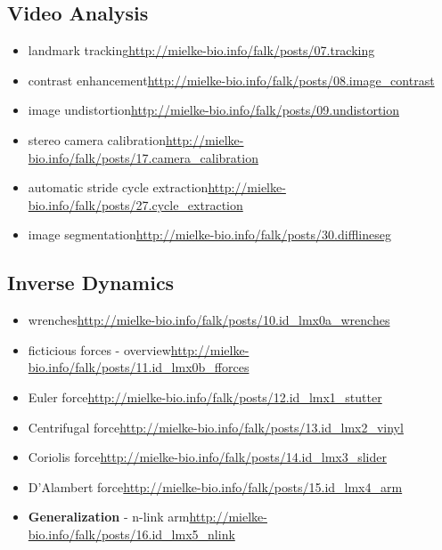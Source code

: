 \begin{change}
\subsection{Video Analysis}
\label{sec:org84504e1}
\begin{itemize}
\item landmark tracking\newline \url{http://mielke-bio.info/falk/posts/07.tracking}
\item contrast enhancement\newline \url{http://mielke-bio.info/falk/posts/08.image\_contrast}
\item image undistortion\newline \url{http://mielke-bio.info/falk/posts/09.undistortion}
\item stereo camera calibration\newline \url{http://mielke-bio.info/falk/posts/17.camera\_calibration}
\item automatic stride cycle extraction\newline \url{http://mielke-bio.info/falk/posts/27.cycle\_extraction}
\item image segmentation\newline \url{http://mielke-bio.info/falk/posts/30.difflineseg}
\end{itemize}

\subsection{Inverse Dynamics}
\label{sec:orgf631a76}
\begin{itemize}
\item wrenches\newline \url{http://mielke-bio.info/falk/posts/10.id\_lmx0a\_wrenches}
\item ficticious forces - overview\newline \url{http://mielke-bio.info/falk/posts/11.id\_lmx0b\_fforces}
\item Euler force\newline \url{http://mielke-bio.info/falk/posts/12.id\_lmx1\_stutter}
\item Centrifugal force\newline \url{http://mielke-bio.info/falk/posts/13.id\_lmx2\_vinyl}
\item Coriolis force\newline \url{http://mielke-bio.info/falk/posts/14.id\_lmx3\_slider}
\item D'Alambert force\newline \url{http://mielke-bio.info/falk/posts/15.id\_lmx4\_arm}
\item \textbf{Generalization} - n-link arm\newline \url{http://mielke-bio.info/falk/posts/16.id\_lmx5\_nlink}
\end{itemize}


\end{change}
